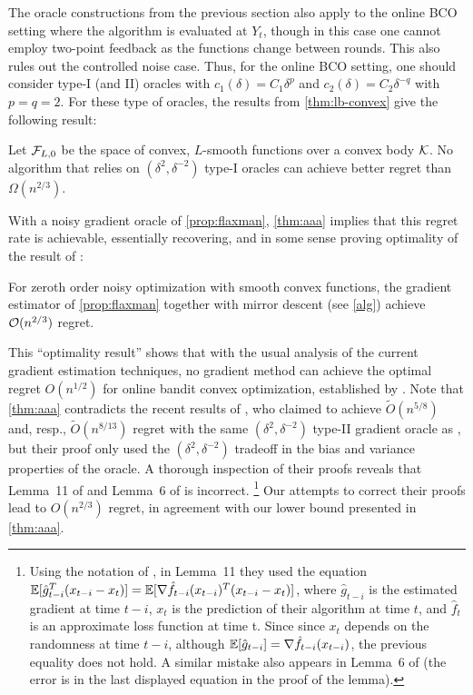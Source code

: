 The oracle constructions from the previous section also apply to the online BCO setting
where the algorithm is evaluated at $Y_t$, though in this case 
one cannot employ two-point feedback as the functions change between rounds. 
This also rules out the controlled noise case. 
Thus, for the online BCO setting, one should consider type-I (and II) oracles with $c_1(\delta) = C_1 \delta^p$ and $c_2(\delta) = C_2\delta^{-q}$ with $p=q=2$.
For these type of oracles, the results from \cref{thm:lb-convex} give the following result: 
\begin{theorem}\label{thm:aaa}
Let $\mathcal{F}_{L,0}$ be the space of convex, $L$-smooth functions over a convex body $\mathcal{K}$.
No algorithm that relies on 
 $(\delta^2,\delta^{-2})$ type-I oracles
 can achieve better regret than $\Omega(n^{2/3})$.
\end{theorem}
With a noisy gradient oracle of \cref{prop:flaxman}, \cref{thm:aaa} implies that this regret rate is achievable, essentially recovering, and in some sense proving optimality of the result of \citet{saha2011improved}:
\begin{theorem}
For zeroth order noisy optimization with smooth convex functions, the gradient estimator of \cref{prop:flaxman} together with mirror descent (see \cref{alg}) achieve $\mathcal{O}(n^{2/3})$ regret.
\end{theorem}
This ``optimality result'' shows that with the usual analysis of the current gradient estimation techniques, no gradient method can achieve the optimal regret $O(n^{1/2})$ for online bandit convex optimization, established by \citet{BubeckDKP15,BuEl15}. Note that \cref{thm:aaa} contradicts the recent results of \citet{DeElKo15,YaMo16}, who claimed to achieve $\tilde{O}(n^{5/8})$ and, resp., $\tilde{O}(n^{8/13})$ regret with the same $(\delta^2,\delta^{-2})$ type-II gradient oracle as \citet{saha2011improved}, but their proof only used the $(\delta^2,\delta^{-2})$ tradeoff in the bias and variance properties of the oracle.
A thorough inspection of their proofs reveals that Lemma~11 of \citet{DeElKo15} and Lemma~6 of \citet{YaMo16} is incorrect.%
\footnote{Using the notation of \citet{DeElKo15}, in Lemma~11 they used the equation $\mathbb{E}[\hat{g}_{t-i}^T(x_{t-i} - x_t)] = \mathbb{E}[\nabla \hat{f}_{t-i} (x_{t-i})^T(x_{t-i} - x_t)]$, where $\hat{g}_{t-i}$ is the estimated gradient at time $t-i$, $x_t$ is the prediction of their algorithm at time $t$, and $\hat{f}_t$ is an approximate loss function at time t. Since since $x_t$ depends on the randomness at time $t-i$, although $\mathbb{E}[\hat{g}_{t-i}] = \nabla \hat{f}_{t-i} (x_{t-i})$, the previous equality does not hold. A similar mistake also appears in Lemma~6 of \citet{YaMo16} (the error is in the last displayed equation in the proof of the lemma).}
Our attempts to correct their proofs lead to $O(n^{2/3})$ regret, in agreement with our lower bound presented in \cref{thm:aaa}.





